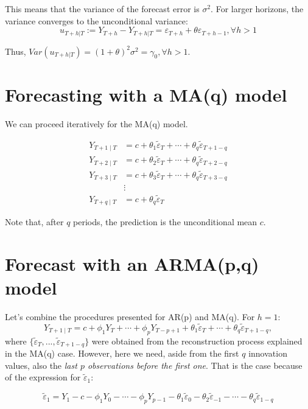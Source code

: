 \documentclass[11pt, a4paper]{report}
\theoremstyle{plain}
\theoremstyle{plain}
\theoremstyle{remark}
\begin{document}
This means that the variance of the forecast error is $\sigma^2$. For larger horizons, the variance converges to the unconditional variance: 
$$ u_{T+h|T} := Y_{T+h} - Y_{T+h|T} = \varepsilon_{T+h} + \theta \varepsilon_{T+h-1}, \forall h>1$$

Thus, $ Var(u_{T+h|T}) = (1+\theta)^2 \sigma^2 = \gamma_0, \forall h > 1$.

\section{Forecasting with a MA(q) model}

We can proceed iteratively for the MA(q) model.

$$\begin{aligned}
	Y_{T+1 \mid T} &=c+\theta_{1} \widetilde{\varepsilon}_{T}+\cdots+\theta_{q} \widetilde{\varepsilon}_{T+1-q} \\
	Y_{T+2 \mid T} &=c+\theta_{2} \widetilde{\varepsilon}_{T}+\cdots+\theta_{q} \widetilde{\varepsilon}_{T+2-q} \\
	Y_{T+3 \mid T} &=c+\theta_{3} \widetilde{\varepsilon}_{T}+\cdots+\theta_{q} \widetilde{\varepsilon}_{T+3-q} \\
	& \vdots \\
	Y_{T+q \mid T} &=c+\theta_{q} \widetilde{\varepsilon}_{T}
\end{aligned}$$

Note that, after $q$ periods, the prediction is the unconditional mean $c$.

\section{Forecast with an ARMA(p,q) model}

Let's combine the procedures presented for AR(p) and MA(q). For $h=1$:
$$Y_{T+1 \mid T}=c+\phi_{1} Y_{T}+\cdots+\phi_{p} Y_{T-p+1}+\theta_{1} \widetilde{\varepsilon}_{T}+\cdots+\theta_{q} \widetilde{\varepsilon}_{T+1-q},$$
where $\{\widetilde{\varepsilon}_{T}, ..., \widetilde{\varepsilon}_{T+1-q}\}$ were obtained from the reconstruction process explained in the MA(q) case. However, here we need, aside from the first $q$ innovation values, also the \textit{last $p$ observations before the first one}. That is the case because of the expression for $\widetilde{\varepsilon}_{1}$:

$$\widetilde{\varepsilon}_{1}=Y_{1}-c-\phi_{1} Y_{0}-\cdots-\phi_{p} Y_{p-1}-\theta_{1} \widetilde{\varepsilon}_{0}-\theta_{2} \widetilde{\varepsilon}_{-1}-\cdots-\theta_{q} \widetilde{\varepsilon}_{1-q}$$
\end{document}
